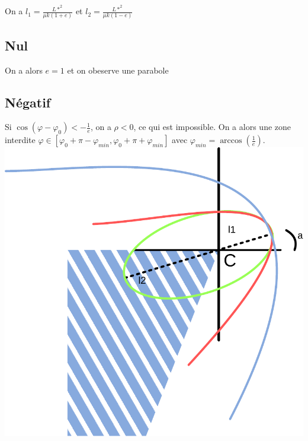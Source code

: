 \documentclass[french]{yLectureNote}
\begin{document}
On a \(l_1 = \frac{L*^2}{\mu k (1+e)}\) et \(l_2 = \frac{L*^2}{\mu k (1-e)}\)
\subsection{Nul}
On a alors \(e=1\) et on obeserve une parabole
\subsection{Négatif}
Si \(\cos(\varphi-\varphi_0)<-\frac{1}{e}\), on a \(\rho <0\), ce qui est impossible. On a alors une zone interdite \(\varphi \in [\varphi_0+\pi -\varphi_{min}, \varphi_0+\pi + \varphi_{min}]\) avec \(\varphi_{min} = \arccos(\frac{1}{e})\).
\includegraphics[scale=0.5]{mouv}
 
\end{document}
